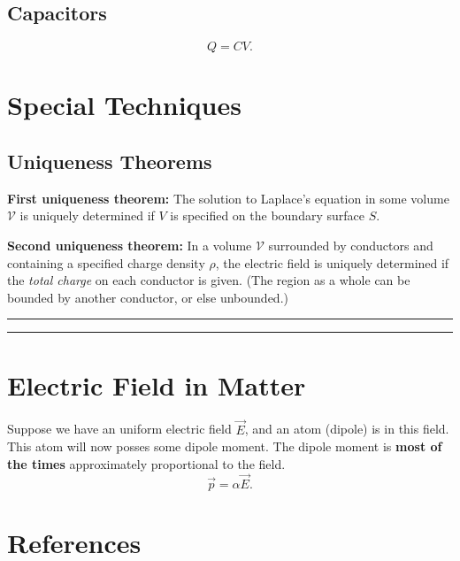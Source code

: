 \documentclass[a4paper]{article}
\numberwithin{equation}{subsection}
\begin{document}
\subsection{Capacitors}

\begin{equation*}
    Q = CV.
\end{equation*}

\medskip
\section{Special Techniques}
\subsection{Uniqueness Theorems}
\textbf{First uniqueness theorem:} The solution to Laplace's equation in some volume $\mathcal{V}$ is uniquely determined if $V$ is specified on the boundary surface $S$.

\textbf{Second uniqueness theorem:} In a volume $\mathcal{V}$ surrounded by conductors and containing a specified charge density $\rho$, the electric field is uniquely determined if the \textit{total charge} on each conductor is given. (The region as a whole can be bounded by another conductor, or else unbounded.)\cite{Griffiths:611579}

\par\noindent\rule{\textwidth}{0.4pt}
\par\noindent\rule{\textwidth}{0.4pt}
\section{Electric Field in Matter}
Suppose we have an uniform electric field $\vec{E}$, and an atom (dipole) is in this field. This atom will now posses some dipole moment. The dipole moment is \textbf{most of the times} approximately proportional to the field.
\begin{equation}
    \vec{p} = \alpha \vec{E}.
\end{equation} 

\newpage
\section*{References}
%
\printbibliography
[heading = none]

\end{document}
